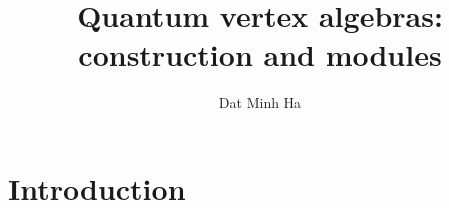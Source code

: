 

\setcounter{section}{-1}





    \title{Quantum vertex algebras: construction and modules}
    
    \author{Dat Minh Ha}
    \maketitle
    
    \begin{abstract}
        
    \end{abstract}
    
    {
      \hypersetup{} 
      \tableofcontents %
    }

    \section{Introduction}

    

    

    \begin{appendices}
        
    \end{appendices}
	
    \printbibliography


